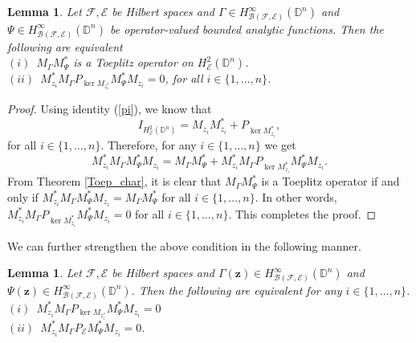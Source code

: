 \documentclass[12pt]{amsart}
\newtheorem{lemma}[propn]{Lemma}
\theoremstyle{definition}
\newcommand{\D}{\mathbb{D}}
\newcommand{\1}{{\mbox{\bf 1}}}
\newcommand{\clb}{\mathcal{B}}
\newcommand{\cle}{\mathcal{E}}
\newcommand{\clf}{\mathcal{F}}
\begin{document}
\begin{lemma}\label{toepcondn1}
Let $\clf, \cle$ be Hilbert spaces and $\Gamma \in H_{\clb(\clf, \cle)}^{\infty}(\D^n)$ and $\Psi \in H_{\clb(\clf,  \cle)}^{\infty}(\D^n)$ be operator-valued bounded analytic functions. Then the following are equivalent\\
$(i)$~$M_{\Gamma}M_{\Psi}^*$ is a Toeplitz operator on $H_{\cle}^2(\D^n)$.\\
$(ii)$~$M_{z_i}^*M_{\Gamma} P_{\ker M_{z_i^*}} M_{\Psi}^*  M_{z_i}= 0$, for all $i \in \{1,\ldots,n\}$.
\end{lemma}
\begin{proof}
Using identity (\ref{pi}), we know that 
\[
I_{H^2_{\cle}(\D^n)} = M_{z_i}M_{z_i}^* + P_{\ker M_{z_i}^*},
\]
for all $i \in \{1,\ldots,n\}$. Therefore, for any $i \in \{1,\ldots,n\}$ we get
\[
M_{z_i}^* M_{\Gamma} M_{\Psi}^* M_{z_i} =M_{\Gamma}M_{\Psi}^* + M_{z_i}^* M_{\Gamma} P_{\ker M_{z_i}^*} M_{\Psi}^* M_{z_i}.
\]
From Theorem \ref{Toep_char}, it is clear that $M_{\Gamma}M_{\Psi}^*$ is a Toeplitz operator if and only if $M_{z_i}^* M_{\Gamma} M_{\Psi}^* M_{z_i} = M_{\Gamma} M_{\Psi}^*$ for all $i \in \{1,\ldots,n\}$. In other words, $M_{z_i}^* M_{\Gamma} P_{\ker M_{z_i}^*} M_{\Psi}^* M_{z_i}=0$ for all $i \in \{1,\ldots,n\}$.  This completes the proof.
\end{proof}
We can further strengthen the above condition in the following manner.
\begin{lemma}\label{toepcondn2}
Let $\clf, \cle$ be Hilbert spaces and $\Gamma(\bm{z}) \in H_{\clb(\clf, \cle)}^{\infty}(\D^n)$ and $\Psi(\bm{z}) \in H_{\clb(\clf,  \cle)}^{\infty}(\D^n)$. Then the following are equivalent for any $i \in \{1,\ldots,n\}$.\\
$(i)$~$M_{z_i}^*M_{\Gamma} P_{\ker M_{z_i^*}} M_{\Psi}^*  M_{z_i}= 0$\\
$(ii)$~$M_{z_i}^*M_{\Gamma} P_{\cle} M_{\Psi}^*  M_{z_i}= 0$.
\end{lemma}
\end{document}
